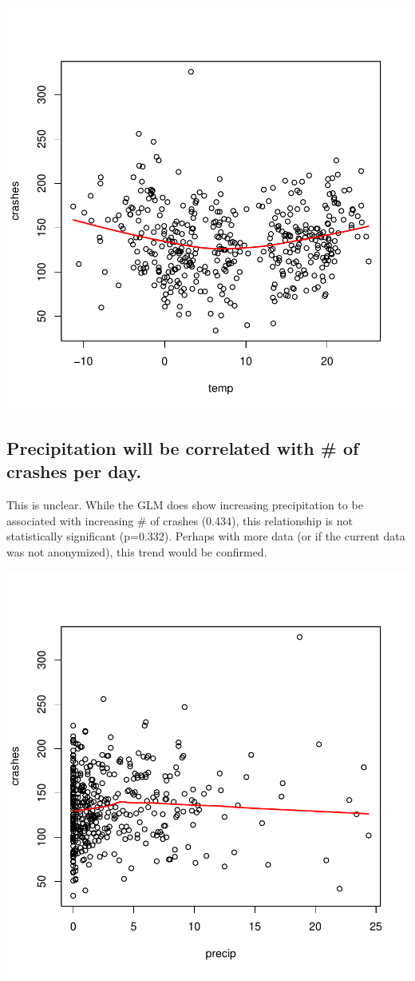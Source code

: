 \documentclass[11pt, a4paper]{article}
\begin{document}
\includegraphics{regression-045}





\pagebreak
\subsection{Precipitation will be correlated with \# of crashes per day.} 

This is unclear. While the GLM does show increasing precipitation to be associated with increasing \# of crashes (0.434), this relationship is not statistically significant (p=0.332). Perhaps with more data (or if the current data was not anonymized), this trend would be confirmed. 

\includegraphics{regression-046}
\end{document}
